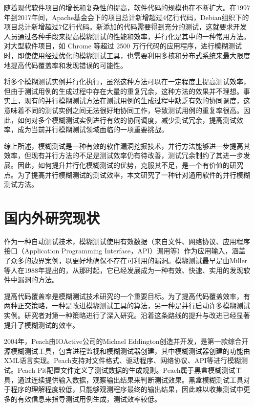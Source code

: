 \documentclass[master]{thesis-uestc}
\begin{document}
随着现代软件项目的增长和复杂性的提高，软件代码的规模也在不断扩大。在1997年到2017年间，Apache基金会下的项目总计新增超过4亿行代码，Debian组织下的项目总计新增超过7亿行代码。新添加的代码需要得到充分的测试，这就要求开发人员通过各种手段来提高模糊测试的性能和效率，并行化是其中的一种常用方法。对大型软件项目，如 Chrome 等超过 2500 万行代码的应用程序，进行模糊测试时，即使使用经过优化的模糊测试工具，也需要利用多核和分布式系统来最大限度地提高代码覆盖率和发现错误的可能性。

将多个模糊测试实例并行化执行，虽然这种方法可以在一定程度上提高测试效率，但由于测试用例的生成过程中存在大量的重复冗余，这种方法的效果并不理想。事实上，现有的并行模糊测试方法在测试用例的生成过程中缺乏有效的协同调度，这意味着不同的测试实例之间无法很好地协同工作，导致测试用例的重复率很高。因此，如何对多个模糊测试实例进行有效的协同调度，减少测试冗余，提高测试效率，成为当前并行模糊测试领域面临的一项重要挑战。

综上所述，模糊测试是一种有效的软件漏洞挖掘技术，并行方法能够进一步提高其效率，但现有并行方法的不足是测试效率仍有待改善，测试冗余制约了其进一步发展。因此，如何提升并行化模糊测试的优势，克服其不足，是一个有价值的研究点。为了提高并行模糊测试的测试效率，本文研究了一种针对通用软件的并行模糊测试方法。

\section{国内外研究现状}
作为一种自动测试技术，模糊测试使用有效数据（来自文件、网络协议、应用程序接口（Application Programming Interface，API）调用等）作为应用输入，涵盖了众多的边界案例，以更好地确保不存在可利用的漏洞。模糊测试最早是由Miller等人在1988年提出的，从那时起，它已经发展成为一种有效、快速、实用的发现软件中漏洞的方法。

提高代码覆盖率是模糊测试技术研究的一个重要目标。为了提高代码覆盖效率，有两种正交策略，一种是改进模糊测试工具的算法，另一种是并行启动许多模糊测试实例。研究者对第一种策略进行了深入研究。沿着这条路线的提升与改进已经显著提升了模糊测试的效率。

2004年，Peach由IOActive公司的Michael Eddington创造并开发，是第一款综合开源模糊测试工具，包含进程监视和模糊测试器创建，其中模糊测试器创建的功能由XML语言实现。Peach支持对文件格式、驱动程序、网络协议、API等进行模糊测试。Peach Pit配置文件定义了测试数据的生成规则。Peach属于黑盒模糊测试工具，通过连续提供输入数据，观察输出结果来判断测试效果。黑盒模糊测试工具对于程序的理解程度较低，只能够观测程序最终的输出结果，因此难以收集测试中更多的有效信息来指导测试用例生成，测试效率较低。
\end{document}
